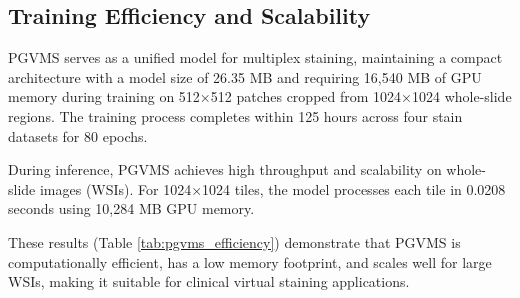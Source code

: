 \documentclass[journal,twoside,web]{ieeecolor}
\begin{document}
\subsection{Training Efficiency and Scalability}
{
PGVMS serves as a unified model for multiplex staining, maintaining a compact architecture with a model size of 26.35 MB and requiring 16,540 MB of GPU memory during training on 512×512 patches cropped from 1024×1024 whole-slide regions. The training process completes within 125 hours across four stain datasets for 80 epochs.}
\begin{table}[h!]
\centering
\caption{{Computational efficiency of PGVMS during training and inference.}}
\label{tab:pgvms_efficiency}
\end{table}


{
During inference, PGVMS achieves high throughput and scalability on whole-slide images (WSIs). 
For 1024×1024 tiles, the model processes each tile in 0.0208 seconds using 10,284 MB GPU memory. 
}

{
These results (Table \ref{tab:pgvms_efficiency}) demonstrate that PGVMS is computationally efficient, has a low memory footprint, 
and scales well for large WSIs, making it suitable for clinical virtual staining applications.
}
\end{document}
